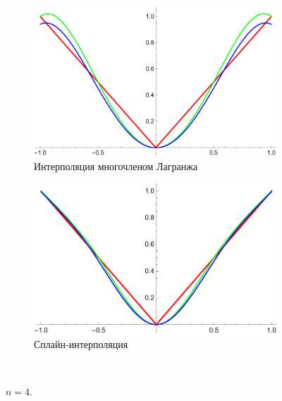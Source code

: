 \documentclass[12pt, a4paper]{article}
\begin{document}
	
	\begin{figure}[H]
		\centering
		\begin{subfigure}{0.4\textwidth}
			\includegraphics[width=\textwidth]{7_l4}
			\caption{Интерполяция многочленом Лагранжа}
		\end{subfigure}
		\hfill
		\begin{subfigure}{0.4\textwidth}
			\includegraphics[width=\textwidth]{7_s4}
			\caption{Сплайн-интерполяция}
		\end{subfigure}
		\hfill
		\\[0.5cm]
		\caption{$n = 4$.}
	\end{figure}
	
\end{document}
